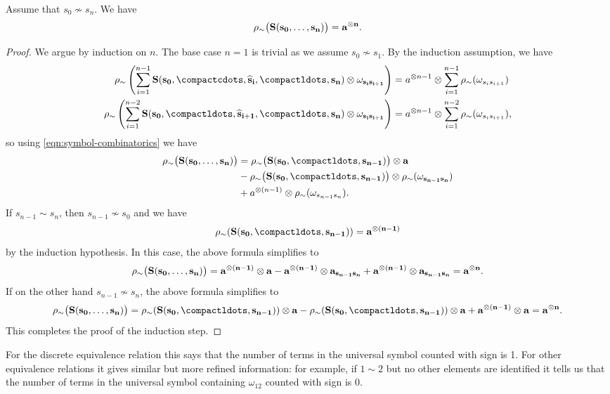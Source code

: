 \documentclass[a4paper]{amsart}
\begin{document}
\begin{lemma}\label{lem:symbol and equivalence relation} Assume that $s_0 \not \sim s_n$. We have 
\[
\rho_{\sim}\bigl(\bf{S}(s_0,\dots,s_n)\bigr)=a^{\otimes n}.
\]
\end{lemma}
\begin{proof}
We argue by induction on $n$. The base case $n=1$ is trivial as we assume $s_0 \not \sim s_1$. By the induction assumption,  we have
\begin{align*}
\rho_{\sim}\left (\sum_{i=1}^{n-1} \bf{S}(s_0,\compactcdots,\widehat{s}_i,\compactldots,s_n)\otimes \omega_{s_is_{i+1}}\right) &= a^{\otimes n-1}\otimes \sum_{i=1}^{n-1} \rho_{\sim}(\omega_{s_is_{i+1}}) \\
\rho_{\sim}\left(\sum_{i=1}^{n-2} \bf{S}(s_0,\compactldots,\widehat{s}_{i+1},\compactldots,s_n)\otimes \omega_{s_is_{i+1}} \right) &=a^{\otimes n-1}\otimes \sum_{i=1}^{n-2} \rho_{\sim}(\omega_{s_is_{i+1}}),\end{align*}
so using \eqref{eqn:symbol-combinatorics} we have 
\begin{align*}
\rho_{\sim}\bigl(\bf{S}(s_0,\dots,s_n)\bigr)&=
\rho_{\sim}\bigl(\bf{S}(s_0,\compactldots,s_{n-1})\bigr)\otimes a
\\
&-\rho_{\sim}\bigl(\bf{S}(s_0,\compactldots,s_{n-1})\big)\otimes \rho_{\sim}(\omega_{s_{n-1}s_n})\\
&+a^{\otimes (n-1)}\otimes \rho_{\sim}(\omega_{s_{n-1}s_n}).
\end{align*}
If $s_{n-1} \sim s_{n}$, then $s_{n-1} \not \sim s_0$ and we have 
\[
\rho_{\sim}(\bf{S}(s_0,\compactldots,s_{n-1}))=a^{\otimes (n-1)}
\]
by the induction hypothesis. In this case, the above formula simplifies to 
\[
\rho_{\sim}\bigl(\bf{S}(s_0,\dots,s_n)\bigr)=
a^{\otimes (n-1)}\otimes a
-a^{\otimes (n-1)}\otimes a_{s_{n-1}s_n}
+a^{\otimes (n-1)}\otimes a_{s_{n-1}s_n}=a^{\otimes n}.
\]
If on the other hand $s_{n-1} \not \sim s_{n}$, the above formula simplifies to
\[
\rho_{\sim}\bigl(\bf{S}(s_0,\dots,s_n)\bigr)=
\rho_{\sim}(\bf{S}(s_0,\compactldots,s_{n-1}))\otimes a
-\rho_{\sim}(\bf{S}(s_0,\compactldots,s_{n-1}))\otimes a
+a^{\otimes (n-1)}\otimes a= a^{\otimes n}.
\]
This completes the proof of the induction step.
\end{proof}

\begin{example}For the discrete equivalence relation this says that the number of terms in the universal symbol counted with sign is 1. For other equivalence relations it gives similar but more refined information: for example, if $1 \sim 2$ but no other elements are identified it tells us that the number of terms in the universal symbol containing $\omega_{12}$ counted with sign is $0$.\end{example}
\end{document}
